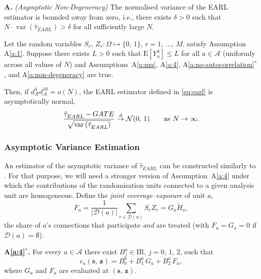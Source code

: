 \documentclass[sigconf,anonymous,review]{acmart}
\newcounter{assumption}
\newenvironment{assumption}{\refstepcounter{assumption}\par\medskip\noindent\textbf{A\theassumption.}\enspace}{\par\medskip}
\newenvironment{assumptionstar}[1]{\par\medskip\noindent\textbf{#1.}\enspace}{\par\medskip}
\newcommand{\E}{\mathrm E}
\newcommand{\R}{\mathrm{I}\!\mathrm{R}}
\DeclareMathOperator{\var}{var}
\begin{document}
\begin{assumption}\label{a:non-degeneracy} \textit{(Asymptotic Non-Degeneracy)} The normalised variance of the EARL estimator is bounded away from zero, i.e., there exists $\delta >0$ such that $N\cdot\var(\hat\tau_{EARL}) > \delta$ for all sufficiently large $N$.
\end{assumption}

\begin{theorem}\label{th:asymptotic-normality}
    Let the random variables $S_r,\,Z_r\colon\Omega\mapsto\{0,\,1\}$, $r=1,\,\ldots,\,M$, satisfy Assumption A\ref{a:1}. Suppose there exists $L>0$ such that $\E[Y_a^4] \le L$ for all $a\in\mathcal A$ (uniformly across all values of $N$) and Assumptions~A\ref{a:mu}, A\ref{a:4}, A\ref{a:no-autocorrelation}$^*$, and A\ref{a:non-degeneracy} are true.

    Then, if $d^{4}_{\mathcal{R}}d^{10}_{\mathcal{A}}=o(N)$, the EARL estimator defined in \eqref{eq:earl} is asymptotically normal,
    \begin{equation*}
        \frac{\hat\tau^{\phantom{1}}_{EARL} - GATE}{\sqrt{\var\left(\hat\tau^{\phantom{1}}_{EARL}\right)}}\stackrel{d}{\to} \mathcal{N}(0,\,1)\qquad \textup{as }N\to\infty.
    \end{equation*}
\end{theorem}

\subsubsection{Asymptotic Variance Estimation}\label{subsubsec:variance}
An estimator of the asymptotic variance of $\hat\tau^{\phantom{1}}_{EARL}$ can be constructed similarly to \cite[Section 5.1]{harshaw2023erl}. For that purpose, we will need a stronger version of Assumption~A\ref{a:4} under which the contributions of the randomisation units connected to a given analysis unit are homogeneous. Define the \emph{joint coverage--exposure} of unit $a$,
\begin{equation}\label{eq:Fa}
    F_a = \frac{1}{|\mathcal{D}(a)|}\sum_{r\in\mathcal{D}(a)} S_rZ_r = G_a\tilde H_a,
\end{equation}
the share of $a$'s connections that participate \emph{and} are treated (with $F_a=G_a=0$ if $\mathcal D(a)=\emptyset$).

\begin{assumptionstar}{A\ref{a:4}$^*$}
For every $a\in\mathcal A$ there exist $B^a_j\in\R$, $j=0,\,1,\,2$, such that
\begin{equation*}
    e_a(\mathbf s,\,\mathbf z) = B^a_0 + B^a_1 \, G_a + B^a_2 \, F_a ,
\end{equation*}
where $G_a$ and $F_a$ are evaluated at $(\mathbf s,\,\mathbf z)$.
\end{assumptionstar}
\end{document}

